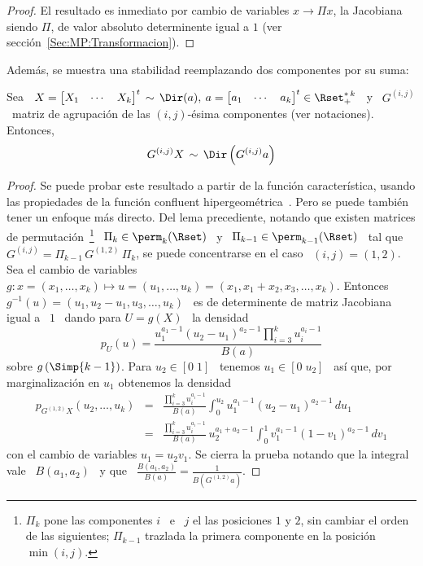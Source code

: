 %
\begin{proof}
  El resultado es inmediato por cambio  de variables $x \to \Pi x$, la Jacobiana
  siendo   $\Pi$,   de   valor   absoluto   determinente  igual   a   $1$   (ver
  secci\'on~\ref{Sec:MP:Transformacion}).
\end{proof}
%
Adem\'as, se muestra una stabilidad reemplazando dos componentes por su suma:
%
\begin{lema}\label{Lem:MP:StabSumaDir}
%
  Sea  \ $X =  \begin{bmatrix} X_1  & \cdots  & X_k  \end{bmatrix}^t \,  \sim \,
  \Dir(a),  \:  a =  \begin{bmatrix}  a_1 &  \cdots  &  a_k \end{bmatrix}^t  \in
  \Rset_+^{*  \,  k}$  \  y  \  $G^{(i,j)}$ \  matriz  de  agrupaci\'on  de  las
  $(i,j)$-\'esima componentes (ver notaciones). Entonces,
  \[
  G^{(i,j)} X \, \sim \, \Dir\left( G^{(i,j)} a \right)  
  \]
\end{lema}
%
\begin{proof}
  Se  puede probar  este resultado  a partir  de la  funci\'on caracter\'istica,
  usando      las      propiedades      de      la      funci\'on      confluent
  hipergeom\'etrica~\cite{SriKar85, Hum22, App25,  AppKam26, Erd37, Erd40}. Pero
  se  puede tambi\'en  tener un  enfoque m\'as  directo.  Del  lema precediente,
  notando  que  existen  matrices  de permutaci\'on~\footnote{$\Pi_k$  pone  las
    componentes $i$ \ e \ $j$ el  las posiciones $1$ y $2$, sin cambiar el orden
    de  las  siguientes;  $\Pi_{k-1}$  trazlada  la  primera  componente  en  la
    posici\'on $\min(i,j)$.}  \ $\Pi_k \in  \perm_k(\Rset)$ \ y \ $\Pi_{k-1} \in
  \perm_{k-1}(\Rset)$ \ tal que \ $G^{(i,j)} = \Pi_{k-1} \, G^{(1,2)} \, \Pi_k$,
  se puede concentrarse en el caso \ $(i,j) = (1,2)$. Sea el cambio de variables
  $g:    x    =    (x_1,\ldots,x_k)    \mapsto   u    =    (u_1,\ldots,u_k)    =
  (x_1,x_1+x_2,x_3,\ldots,x_k)$.        Entonces       \      $g^{-1}(u)       =
  (u_1,u_2-u_1,u_3,\ldots,u_k)$ \ es de determinente de matriz Jacobiana igual a
  \ $1$ \ dando para $U = g(X)$ \ la densidad
  \[
  p_U(u)  = \frac{u_1^{a_1-1}  \left(  u_2 -  u_1 \right)^{a_2-1}  \prod_{i=3}^k
    u_i^{a_i-1}}{B(a)}
  \]
  sobre $g\left(  \Simp{k-1} \right)$. Para $u_2  \in [0 \; 1]$  \ tenemos $u_1
  \in [  0 \;  u_2]$ \ as\'i  que, por  marginalizaci\'on en $u_1$  obtenemos la
  densidad
  \begin{eqnarray*}
  p_{G^{(1,2)} X}(u_2,\ldots,u_k) & = & \frac{\prod_{i=3}^k u_i^{a_i-1}}{B(a)}
  \int_0^{u_2} u_1^{a_1-1} \left( u_2 - u_1 \right)^{a_2-1} \, du_1\\[2mm]
  & = & \frac{\prod_{i=3}^k u_i^{a_i-1}}{B(a)} \, u_2^{a_1+a_2-1} \int_0^1
  v_1^{a_1-1} \left( 1 - v_1 \right)^{a_2-1} \, dv_1
  \end{eqnarray*}
  con el cambio de variables $u_1 = u_2 v_1$. Se cierra la prueba notando que la
  integral   vale  \  $B(a_1,a_2)$   \  y   que  \   $\frac{B(a_1,a_2)}{B(a)}  =
  \frac{1}{B\left( G^{(1,2)} a \right)}$.
\end{proof}

